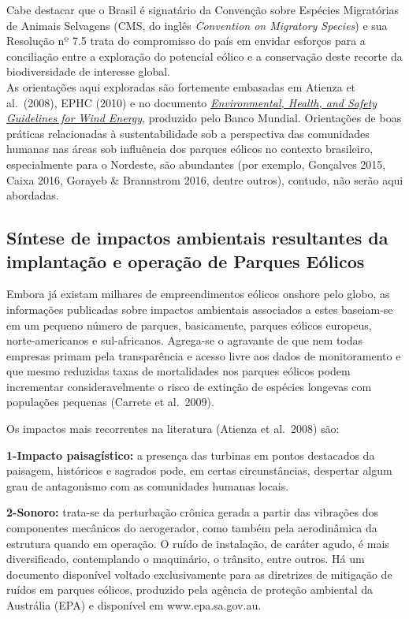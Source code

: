 \documentclass[
]{scrbook}
\begin{document}
Cabe destacar que o Brasil é signatário da Convenção sobre Espécies Migratórias de Animais Selvagens (CMS, do inglês \emph{Convention on Migratory Species}) e sua Resolução nº 7.5 trata do compromisso do país em envidar esforços para a conciliação entre a exploração do potencial eólico e a conservação deste recorte da biodiversidade de interesse global.\\
As orientações aqui exploradas são fortemente embasadas em Atienza et al.~(2008), EPHC (2010) e no documento \href{http://www.ifc.org/ehsguidelines}{\emph{Environmental, Health, and Safety Guidelines for Wind Energy}}, produzido pelo Banco Mundial. Orientações de boas práticas relacionadas à sustentabilidade sob a perspectiva das comunidades humanas nas áreas sob influência dos parques eólicos no contexto brasileiro, especialmente para o Nordeste, são abundantes (por exemplo, Gonçalves 2015, Caixa 2016, Gorayeb \& Brannstrom 2016, dentre outros), contudo, não serão aqui abordadas.

\hypertarget{sintese}{%
\subsection{Síntese de impactos ambientais resultantes da implantação e operação de Parques Eólicos}\label{sintese}}

Embora já existam milhares de empreendimentos eólicos onshore pelo globo, as informações publicadas sobre impactos ambientais associados a estes baseiam-se em um pequeno número de parques, basicamente, parques eólicos europeus, norte-americanos e sul-africanos. Agrega-se o agravante de que nem todas empresas primam pela transparência e acesso livre aos dados de monitoramento e que mesmo reduzidas taxas de mortalidades nos parques eólicos podem incrementar consideravelmente o risco de extinção de espécies longevas com populações pequenas (Carrete et al.~2009).

Os impactos mais recorrentes na literatura (Atienza et al.~2008) são:

\textbf{1-Impacto paisagístico:} a presença das turbinas em pontos destacados da paisagem, históricos e sagrados pode, em certas circunstâncias, despertar algum grau de antagonismo com as comunidades humanas locais.

\textbf{2-Sonoro:} trata-se da perturbação crônica gerada a partir das vibrações dos componentes mecânicos do aerogerador, como também pela aerodinâmica da estrutura quando em operação. O ruído de instalação, de caráter agudo, é mais diversificado, contemplando o maquinário, o trânsito, entre outros. Há um documento disponível voltado exclusivamente para as diretrizes de mitigação de ruídos em parques eólicos, produzido pela agência de proteção ambiental da Austrália (EPA) e disponível em www.epa.sa.gov.au.
\end{document}
